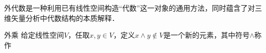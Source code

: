 
外代数是一种利用已有线性空间构造“代数”这一对象的通用方法，同时蕴含了对三维矢量分析中代数结构的本质解释．

\begin{definition}{外乘}
给定线性空间$V$，任取$x, y\in V$，定义$x\wedge y\not\in V$是一个新的元素，其中符号$\wedge$称作
\end{definition}